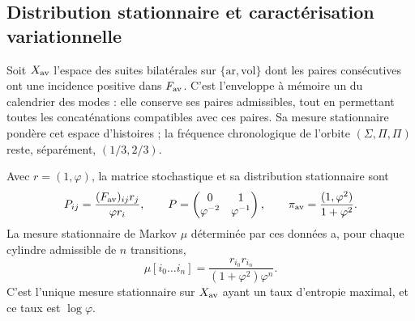 \subsection{Distribution stationnaire et caractérisation variationnelle}
\label{v:subsec:parry-explicita}

Soit \(X_{\rm av}\) l’espace des suites bilatérales sur
\(\{\mathrm{ar},\mathrm{vol}\}\) dont les paires consécutives ont une
incidence positive dans \(F_{\rm av}\). C’est l’enveloppe à mémoire un
du calendrier des modes : elle conserve ses paires admissibles, tout en permettant
toutes les concaténations compatibles avec ces paires. Sa mesure
stationnaire pondère cet espace d’histoires ; la fréquence chronologique
de l’orbite \((\Sigma,\Pi,\Pi)\) reste, séparément,
\((1/3,2/3)\).

\begin{proposition}
\label{v:prop:parry-explicita}
Avec \(r=(1,\varphi)\), la matrice stochastique et sa distribution
stationnaire sont
\begin{equation}
 P_{ij}=\frac{(F_{\rm av})_{ij}r_j}{\varphi r_i},\qquad
 P=\begin{pmatrix}0&1\\\varphi^{-2}&\varphi^{-1}\end{pmatrix},
 \qquad
 \pi_{\rm av}=\frac{(1,\varphi^2)}{1+\varphi^2}.
 \label{v:eq:parry-transicion-estacionaria}
\end{equation}
La mesure stationnaire de Markov \(\mu\) déterminée par ces données
a, pour chaque cylindre admissible de \(n\) transitions,
\begin{equation}
 \mu[i_0\ldots i_n]
 =\frac{r_{i_0}r_{i_n}}{(1+\varphi^2)\varphi^n}.
 \label{v:eq:parry-cilindros}
\end{equation}
C’est l’unique mesure stationnaire sur \(X_{\rm av}\) ayant un taux
d’entropie maximal, et ce taux est \(\log\varphi\).
\end{proposition}

